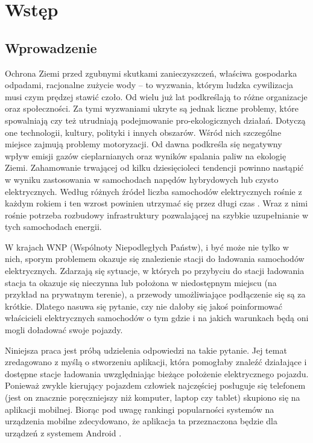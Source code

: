 \chapter{Wstęp}

\section{Wprowadzenie}
Ochrona Ziemi przed zgubnymi skutkami zanieczyszczeń, właściwa gospodarka odpadami, racjonalne zużycie wody -- to wyzwania, którym ludzka cywilizacja musi czym prędzej stawić czoło. Od wielu już lat podkreślają to różne organizacje oraz społeczności. Za tymi wyzwaniami ukryte są jednak liczne problemy, które spowalniają czy też utrudniają podejmowanie pro-ekologicznych działań. Dotyczą one technologii, kultury, polityki i innych obszarów. Wśród nich szczególne miejsce zajmują problemy motoryzacji. Od dawna podkreśla się negatywny wpływ emisji gazów cieplarnianych oraz wyników spalania paliw na ekologię Ziemi. Zahamowanie trwającej od kilku dziesięcioleci tendencji powinno nastąpić w wyniku zastosowania w samochodach napędów hybrydowych lub czysto elektrycznych. Według różnych źródeł liczba samochodów elektrycznych rośnie z każdym rokiem i ten wzrost powinien utrzymać się przez długi czas \cite{iea1,mam1}. Wraz z nimi rośnie potrzeba rozbudowy infrastruktury pozwalającej na szybkie uzupełnianie w tych samochodach energii. 

W krajach WNP (Wspólnoty Niepodległych Państw), i być może nie tylko w nich, sporym problemem okazuje się znalezienie stacji do ładowania samochodów elektrycznych. Zdarzają się sytuacje, w których po przybyciu do stacji ładowania stacja ta okazuje się nieczynna lub położona w niedostępnym miejscu (na przykład na prywatnym terenie), a przewody umożliwiające podłączenie się są za krótkie. Dlatego nasuwa się pytanie, czy nie dałoby się jakoś poinformować właścicieli elektrycznych samochodów o tym gdzie i na jakich warunkach będą oni mogli doładować swoje pojazdy. 

Niniejsza praca jest próbą udzielenia odpowiedzi na takie pytanie. Jej temat zredagowano z myślą o stworzeniu aplikacji, która pomogłaby znaleźć działające i dostępne stacje ładowania uwzględniając bieżące położenie elektrycznego pojazdu. Ponieważ zwykle kierujący pojazdem człowiek najczęściej posługuje się telefonem (jest on znacznie poręczniejszy niż komputer, laptop czy tablet) skupiono się na aplikacji mobilnej. Biorąc pod uwagę rankingi popularności systemów na urządzenia mobilne zdecydowano, że aplikacja ta przeznaczona będzie dla urządzeń z systemem Android \cite{avi1}.


